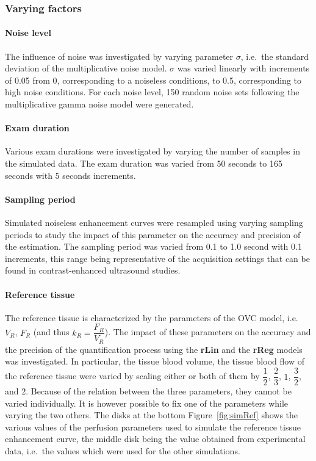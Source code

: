 \subsubsection{Varying factors}
\paragraph{Noise level}
The influence of noise was investigated by varying parameter $\sigma$, i.e.~the standard deviation of the multiplicative noise model.
$\sigma$ was varied linearly with increments of 0.05 from 0, corresponding to a noiseless conditions, to 0.5, corresponding to high noise conditions.
For each noise level, 150 random noise sets following the multiplicative gamma noise model were generated.

\paragraph{Exam duration}
Various exam durations were investigated by varying the number of samples in the simulated data.
The exam duration was varied from 50 seconds to 165 seconds with 5 seconds increments.

\paragraph{Sampling period}
Simulated noiseless enhancement curves were resampled using varying sampling periods to study the impact of this parameter on the accuracy and precision of the estimation.
The sampling period was varied from 0.1 to 1.0 second with 0.1 increments, this range being representative of the acquisition settings that can be found in contrast-enhanced ultrasound studies.

\paragraph{Reference tissue}
The reference tissue is characterized by the parameters of the OVC model, i.e.~$V_R$, $F_R$ (and thus $k_R = \dfrac{F_R}{V_R}$).
The impact of these parameters on the accuracy and the precision of the quantification process using the \textbf{rLin} and the \textbf{rReg} models was investigated.
In particular, the tissue blood volume, the tissue blood flow of the reference tissue were varied by scaling either or both of them by $\dfrac{1}{2}$, $\dfrac{2}{3}$, $1$, $\dfrac{3}{2}$, and $2$.
Because of the relation between the three parameters, they cannot be varied individually.
It is however possible to fix one of the parameters while varying the two others.
The disks at the bottom Figure~\ref{fig:simRef} shows the various values of the perfusion parameters used to simulate the reference tissue enhancement curve, the middle disk being the value obtained from experimental data, i.e.~the values which were used for the other simulations.

